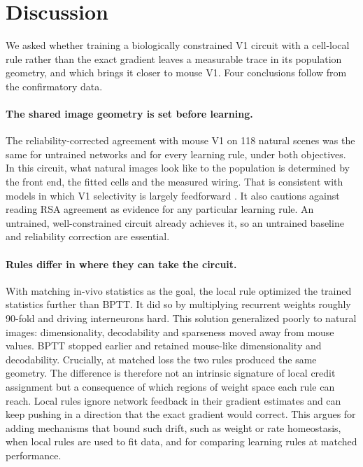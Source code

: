 \section{Discussion}

We asked whether training a biologically constrained V1 circuit with a cell-local rule rather than
the exact gradient leaves a measurable trace in its population geometry, and which brings it closer
to mouse V1. Four conclusions follow from the confirmatory data.

\paragraph{The shared image geometry is set before learning.} The reliability-corrected agreement
with mouse V1 on 118 natural scenes was the same for untrained networks and for every learning rule,
under both objectives. In this circuit, what natural images look like to the population is
determined by the front end, the fitted cells and the measured wiring. That is consistent with
models in which V1 selectivity is largely feedforward \citep{lien2018}. It also cautions against
reading RSA agreement as evidence for any particular learning rule. An untrained, well-constrained
circuit already achieves it, so an untrained baseline and reliability correction are essential.

\paragraph{Rules differ in where they can take the circuit.} With matching in-vivo statistics as
the goal, the local rule optimized the trained statistics further than BPTT. It did so by
multiplying recurrent weights roughly 90-fold and driving interneurons hard. This solution
generalized poorly to natural images: dimensionality, decodability and sparseness moved away from
mouse values. BPTT stopped earlier and retained mouse-like dimensionality and decodability.
Crucially, at matched loss the two rules produced the same geometry. The difference is therefore
not an intrinsic signature of local credit assignment but a consequence of which regions of
weight space each rule can reach. Local rules ignore network feedback in their gradient estimates
and can keep pushing in a direction that the exact gradient would correct. This argues for adding
mechanisms that bound such drift, such as weight or rate homeostasis, when local rules are used to
fit data, and for comparing learning rules at matched performance.

